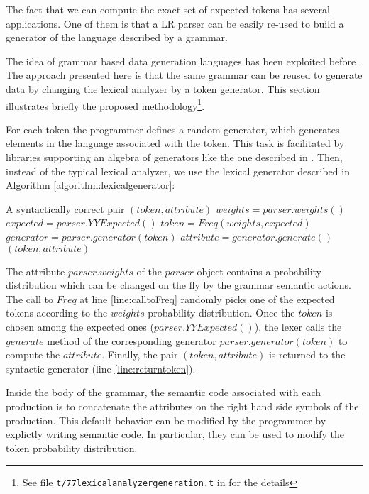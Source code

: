 The fact that we can compute the exact set of expected tokens 
has several applications. One of them is that a LR parser 
can be easily re-used to build a generator of the language described by
a grammar.

The idea  of grammar based data generation languages
has been exploited before \cite{maurer,yagg,yougen}.
The approach presented here is that
the same grammar can be reused to 
generate data 
by changing
the lexical analyzer by a token generator. 
This section illustrates briefly the proposed methodology\footnote{See 
file {\tt t/77lexicalanalyzergeneration.t} in \cite{lgforte} for the details}.

For each token the programmer defines a random generator,
which generates elements in the language associated with the token.
This task is facilitated by libraries supporting an algebra of generators 
like the one described in \cite{testlectrotest}.
Then, instead of the typical lexical analyzer,
we use the lexical generator described in
Algorithm \ref{algorithm:lexicalgenerator}:


\begin{algorithm}[h] 
\caption{$LexicalGenerator(parser)$}
\label{algorithm:lexicalgenerator}
\begin{algorithmic}[1]
\ENSURE A syntactically correct pair $(token, attribute)$
\STATE  \label{line:weights} $weights = parser.weights()$
\STATE  \label{line:expected}$expected = parser.YYExpected()$
\STATE  \label{line:calltoFreq} $token = Freq(weights, expected)$
\STATE  \label{line:setgen}$generator = parser.generator(token)$
\STATE  \label{line:setattr}$attribute = generator.generate()$
\RETURN \label{line:returntoken}$(token, attribute)$
\end{algorithmic}
\end{algorithm}
    
The attribute $parser.weights$ of the $parser$ object
contains a probability distribution
which can be changed on the fly by the grammar semantic actions.
The call to $Freq$ at line \ref{line:calltoFreq}
randomly picks one of the expected tokens
according to the $weights$ probability distribution.
Once the $token$ is chosen among the expected ones ($parser.YYExpected()$), 
the lexer 
calls the $generate$ method of the corresponding generator 
$parser.generator(token)$ to compute the $attribute$.
Finally, the pair $(token, attribute)$ is returned to the
syntactic generator (line \ref{line:returntoken}).

Inside the body of the grammar, 
the semantic code associated with each production is to concatenate the attributes
on the right hand side symbols of the production.
This default behavior can be modified by the programmer by explictly 
writing semantic code. In particular, they can be used to modify the token probability distribution.


